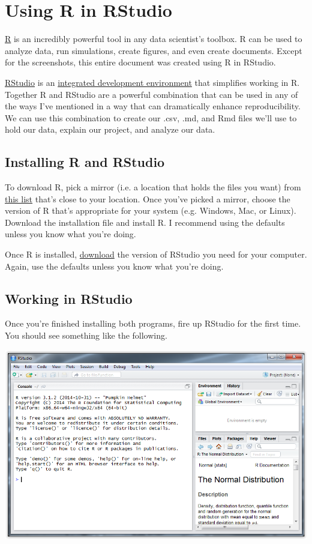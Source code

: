 \documentclass[12pt]{article}
\begin{document}
\section{Using R in RStudio}
\href{http://www.r-project.org/}{R} is an incredibly powerful tool in any data
scientist's toolbox. R can be used to analyze data, run simulations, create
figures, and even create documents. Except for the screenshots, this entire
document was created using R in RStudio.

\href{http://www.rstudio.com/}{RStudio} is an
\href{http://en.wikipedia.org/wiki/Integrated_development_environment}
{integrated development environment} that simplifies working in R. Together
R and RStudio are a powerful combination that can be used in any of the ways I've
mentioned in a way that can dramatically enhance reproducibility. We can use this
combination to create our .csv, .md, and Rmd files we'll use to hold our data,
explain our project, and analyze our data.

\subsection{Installing R and RStudio}
To download R, pick a mirror (i.e. a location that holds the files you want) from
\href{http://cran.r-project.org/mirrors.html}{this list} that's close to your
location. Once you've picked a mirror, choose the version of R that's appropriate
for your system (e.g. Windows, Mac, or Linux). Download the installation file and
install R. I recommend using the defaults unless you know what you're doing.

Once R is installed, \href{http://www.rstudio.com/products/rstudio/download/}
{download} the version of RStudio you need for your computer. Again, use the
defaults unless you know what you're doing.

\subsection{Working in RStudio}
Once you're finished installing both programs, fire up RStudio for the first time. You should see something like the following.

\includegraphics{imgs/R01.PNG}
\end{document}
